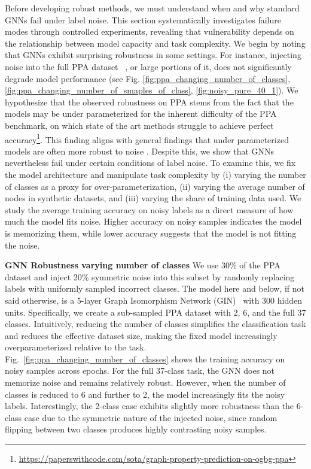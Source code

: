 %
Before developing robust methods, we must understand when and why standard GNNs fail under label noise.
%
This section systematically investigates failure modes through controlled experiments, revealing that vulnerability depends on the relationship between model capacity and task complexity.
%
We begin by noting that GNNs exhibit surprising robustness in some settings.
%
For instance, injecting noise into the full PPA  dataset ~\cite{PPA}, or large portions of it, does not significantly degrade model performance (see Fig.  \ref{fig:ppa_changing_number_of_classes}, \ref{fig:ppa_changing_number_of_smaples_of_class}, \ref{fig:noisy_pure_40_1}). 
%
We hypothesize that the observed robustness on PPA stems from the fact that the models may be under parameterized for the inherent difficulty of the PPA benchmark, on which state of the art methods struggle to achieve perfect accuracy\footnote{\url{https://paperswithcode.com/sota/graph-property-prediction-on-ogbg-ppa}}. 
%
This finding aligns with general findings that under parameterized models are often more robust to noise \cite{memorizenoise}.
%
Despite this, we show that GNNs nevertheless fail under certain conditions of label noise. 
% 
To examine this, we fix the model architecture and manipulate task complexity by (i) varying the number of classes as a proxy for over-parameterization, (ii) varying the average number of nodes in synthetic datasets, and (iii) varying the share of training data used. 
% 
We study the average training accuracy on noisy labels as a direct measure of how much the model fits noise. Higher accuracy on noisy samples indicates the model is memorizing them, while lower accuracy suggests that the model is not fitting the noise.

\textbf{GNN Robustness varying number of classes }
% 
We use 30\% of the PPA dataset and inject 20\% symmetric noise into this subset by randomly replacing labels with uniformly sampled incorrect classes.
% 
The model here and below, if not said otherwise, is a 5-layer Graph Isomorphism Network (GIN)~\cite{WL1} with 300 hidden units.
% 
Specifically, we create a sub-sampled PPA dataset with 2, 6, and the full 37 classes. 
% 
Intuitively, reducing the number of classes simplifies the classification task and reduces the effective dataset size, making the fixed model increasingly overparameterized relative to the task.
% 
Fig.~\ref{fig:ppa_changing_number_of_classes} shows the training accuracy on noisy samples across epochs. 
% 
For the full 37-class task, the GNN does not memorize noise and remains relatively robust. 
% 
However, when the number of classes is reduced to 6 and further to 2, the model increasingly fits the noisy labels. 
% 
Interestingly, the 2-class case exhibits slightly more robustness than the 6-class case due to the symmetric nature of the injected noise, since random flipping between two classes produces highly contrasting noisy samples.
% 

